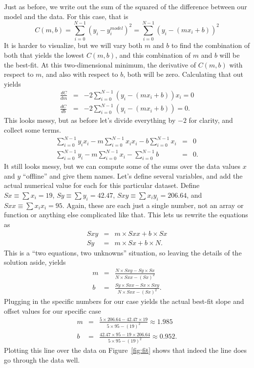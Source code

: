 \documentclass[12pt]{article}
\begin{document}
Just as before, we write out the sum of the squared of the difference between our model and the data. For this case, that is
\begin{equation}
C(m,b) = \sum_{i=0}^{N-1} (y_i - y^{model}_i)^2 = \sum_{i=0}^{N-1} \left(y_i - (mx_i + b) \right)^2
\end{equation}
It is harder to visualize, but we will vary both $m$ and $b$ to find the combination of both that yields the lowest $C(m,b)$, and this combination of $m$ and $b$ will be the best-fit. At this two-dimensional minimum, the derivative of $C(m,b)$ with respect to $m$, and also with respect to $b$, both will be zero. Calculating that out yields
\begin{eqnarray}
\frac{dC}{dm} &=& -2 \sum_{i=0}^{N-1} \left(y_i - (mx_i + b) \right) x_i = 0 \\ \nonumber
\frac{dC}{db} &=& -2 \sum_{i=0}^{N-1} \left(y_i - (mx_i + b) \right) = 0.
\end{eqnarray}
This looks messy, but as before let's divide everything by $-2$ for clarity, and collect some terms.
\begin{eqnarray}
\sum_{i=0}^{N-1} y_i x_i - m \sum_{i=0}^{N-1} x_i x_i - b \sum_{i=0}^{N-1} x_i &=& 0 \\ \nonumber
\sum_{i=0}^{N-1} y_i - m \sum_{i=0}^{N-1} x_i - \sum_{i=0}^{N-1} b &=& 0.
\end{eqnarray}
It still looks messy, but we can compute some of the sums over the data values $x$ and $y$ ``offline'' and give them names. Let's define several variables, and add the actual numerical value for each for this particular dataset. Define $Sx \equiv \sum x_i = 19$, $Sy \equiv \sum y_i = 42.47$, $Sxy \equiv \sum x_i y_i = 206.64$, and $Sxx \equiv \sum x_i x_i = 95$. Again, these are each just a single number, not an array or function or anything else complicated like that. This lets us rewrite the equations as
\begin{eqnarray}
Sxy &=& m \times Sxx + b\times Sx \\ \nonumber
Sy  &=& m \times Sx + b \times N.
\end{eqnarray}
This is a ``two equations, two unknowns'' situation, so leaving the details of the solution aside, yields
\begin{eqnarray}
m &=& \frac{N\times Sxy - Sy \times Sx}{N \times Sxx - (Sx)^2} \\ \nonumber
b &=& \frac{Sy\times Sxx - Sx \times Sxy}{N \times Sxx - (Sx)^2}.
\end{eqnarray}
Plugging in the specific numbers for our case yields the actual best-fit slope and offset values for our specific case
\begin{eqnarray}
m &=& \frac{5\times 206.64 - 42.47 \times 19}{5 \times 95 - (19)^2} \approx 1.985 \\ \nonumber
b &=& \frac{42.47\times 95 - 19 \times 206.64}{5 \times 95 - (19)^2} \approx 0.952.
\end{eqnarray}
Plotting this line over the data on Figure~\ref{fig:fit} shows that indeed the line does go through the data well.
\end{document}
